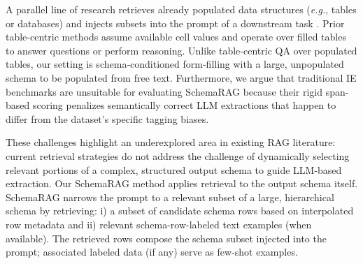 \documentclass[11pt]{article}
\begin{document}
A parallel line of research retrieves already populated data structures (\textit{e.g.}, tables or databases) and injects subsets into the prompt of a downstream task \cite{chen2024tablerag, sui-etal-2024-tap4llm, lin-etal-2023-inner, ye2023large, wang2024chain}. 
Prior table-centric methods assume available cell values and operate over filled tables to answer questions or perform reasoning. 
Unlike table‑centric QA over populated tables, our setting is schema‑conditioned form‑filling with a large, unpopulated schema to be populated from free text.
Furthermore, we argue that traditional IE benchmarks are unsuitable for evaluating SchemaRAG because their rigid 
span-based
scoring penalizes semantically correct LLM extractions that happen to differ from the dataset's specific tagging biases.
 
These challenges highlight an underexplored area in existing RAG literature: current retrieval strategies do not address the challenge of dynamically selecting relevant portions of a complex, structured output schema to guide LLM-based extraction. Our SchemaRAG method applies retrieval to the output schema itself. SchemaRAG narrows the prompt to a relevant subset of a large, hierarchical schema by retrieving: i) a subset of candidate schema rows based on interpolated row metadata and ii) relevant schema-row-labeled text examples (when available). 
The retrieved rows compose the schema subset injected into the prompt; associated labeled
data (if any) serve
as few-shot examples.
\end{document}
